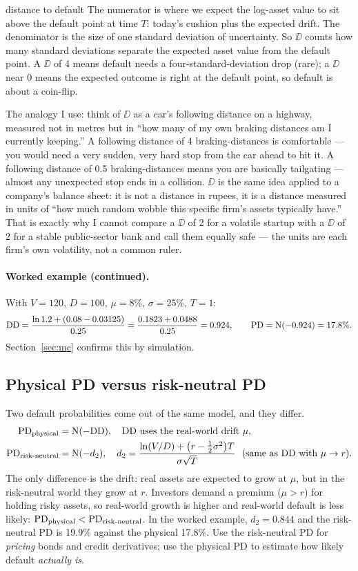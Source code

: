 \begin{defbox}{distance to default}
The numerator is where we expect the log-asset value to sit above the default point at time $T$: today's cushion plus the expected drift. The denominator is the size of one standard deviation of uncertainty. So $\DD$ counts how many standard deviations separate the expected asset value from the default point. A $\DD$ of 4 means default needs a four-standard-deviation drop (rare); a $\DD$ near 0 means the expected outcome is right at the default point, so default is about a coin-flip.

The analogy I use: think of $\DD$ as a car's following distance on a highway, measured not in metres but in ``how many of my own braking distances am I currently keeping.'' A following distance of 4 braking-distances is comfortable — you would need a very sudden, very hard stop from the car ahead to hit it. A following distance of 0.5 braking-distances means you are basically tailgating — almost any unexpected stop ends in a collision. $\DD$ is the same idea applied to a company's balance sheet: it is not a distance in rupees, it is a distance measured in units of ``how much random wobble this specific firm's assets typically have.'' That is exactly why I cannot compare a $\DD$ of 2 for a volatile startup with a $\DD$ of 2 for a stable public-sector bank and call them equally safe — the units are each firm's own volatility, not a common ruler.
\end{defbox}

\paragraph{Worked example (continued).} With $V=120$, $D=100$, $\mu=8\%$, $\sigma=25\%$, $T=1$:
\[
\mathrm{DD}=\frac{\ln1.2+(0.08-0.03125)}{0.25}=\frac{0.1823+0.0488}{0.25}=0.924,\qquad \mathrm{PD}=\mathrm{N}(-0.924)=17.8\%.
\]
Section~\ref{sec:mc} confirms this by simulation.

\subsection{Physical PD versus risk-neutral PD}
\label{sec:physical-rn}
Two default probabilities come out of the same model, and they differ.
\begin{align}
\mathrm{PD}_{\text{physical}}&=\mathrm{N}(-\mathrm{DD}),\quad \mathrm{DD}\text{ uses the real-world drift }\mu,\\
\mathrm{PD}_{\text{risk-neutral}}&=\mathrm{N}(-d_2),\quad d_2=\frac{\ln(V/D)+\big(r-\tfrac12\sigma^2\big)T}{\sigma\sqrt T}\ \ (\text{same as }\mathrm{DD}\text{ with }\mu\to r).
\end{align}
The only difference is the drift: real assets are expected to grow at $\mu$, but in the risk-neutral world they grow at $r$. Investors demand a premium ($\mu>r$) for holding risky assets, so real-world growth is higher and real-world default is less likely: $\mathrm{PD}_{\text{physical}}<\mathrm{PD}_{\text{risk-neutral}}$. In the worked example, $d_2=0.844$ and the risk-neutral PD is 19.9\% against the physical 17.8\%. Use the risk-neutral PD for \emph{pricing} bonds and credit derivatives; use the physical PD to estimate how likely default \emph{actually is}.

